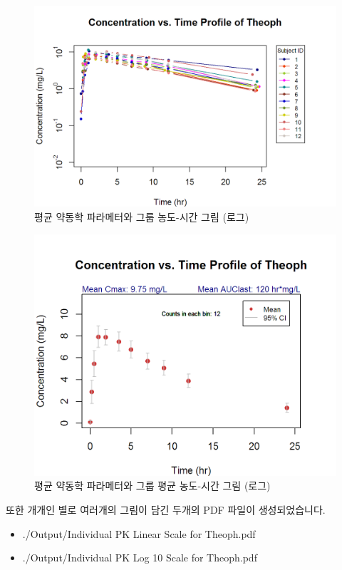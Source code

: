 \documentclass[12pt,]{krantz}
\providecommand{\tightlist}{%
  \setlength{\itemsep}{0pt}\setlength{\parskip}{0pt}}
\begin{document}
\begin{figure}
\includegraphics[width=1\linewidth]{Output/PK_Profile_Log_10_Scale_for_Theoph} \caption{평균 약동학 파라메터와 그룹 농도-시간 그림 (로그)}\label{fig:unnamed-chunk-7}
\end{figure}

\begin{figure}
\includegraphics[width=1\linewidth]{Output/PK_Profile_with_CI_for_Theoph} \caption{평균 약동학 파라메터와 그룹 평균 농도-시간 그림 (로그)}\label{fig:unnamed-chunk-8}
\end{figure}

또한 개개인 별로 여러개의 그림이 담긴 두개의 PDF 파일이 생성되었습니다.

\begin{itemize}
\tightlist
\item
  ./Output/Individual PK Linear Scale for Theoph.pdf
\item
  ./Output/Individual PK Log 10 Scale for Theoph.pdf
\end{itemize}
\end{document}
